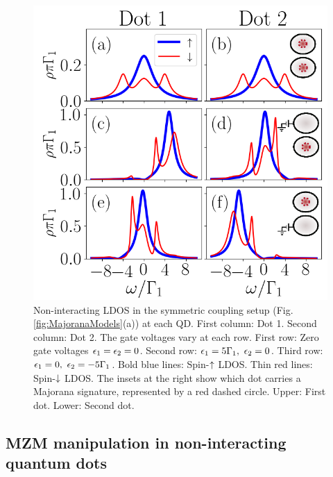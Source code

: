 \documentclass[showpacs,aps,prb,reprint,superscriptaddress]{revtex4-1}
\begin{document}
    \begin{figure}[bt]
        \begin{center}
        \includegraphics[scale=0.48]{Graficos/t1=t2.png}
        \caption{ \label{fig:t1EQt2}  Non-interacting LDOS in the symmetric coupling setup (Fig.\ref{fig:MajoranaModels}(a)) at each QD. First column: Dot 1. Second column: Dot 2. The gate voltages vary at each row.  First row: Zero gate voltages $\epsilon_1=\epsilon_2=0$. Second row: $\epsilon_1=5\Gamma_1, \ \epsilon_2 =0$.  Third row: $\epsilon_1=0, \ \epsilon_2 =-5\Gamma_1$.  Bold blue lines: Spin-$\uparrow$ LDOS. Thin red lines: Spin-$\downarrow$ LDOS. The insets at the right show which dot carries a Majorana signature, represented by a red dashed circle. Upper: First dot. Lower: Second dot. 
        }
    \end{center}
    \end{figure}



     \subsection{MZM manipulation in non-interacting quantum dots \label{subsect:non-int}}

     
\end{document}
